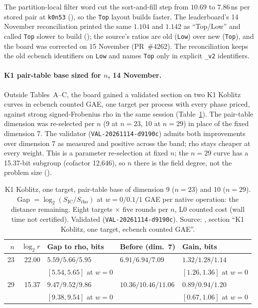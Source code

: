 The partition-local filter word cut the sort-and-fill step from $10.69$ to
$7.86$\,ns per stored pair at \texttt{k0n53}
(),
so the \texttt{Top} layout builds faster. The leaderboard's 14 November
reconciliation printed the same $1.104$ and $1.142$ as ``Top/Low'' and called
\texttt{Top} slower to build (); the source's
ratios are old (\texttt{Low}) over new (\texttt{Top}), and the board was
corrected on 15 November (PR~\#4262). The reconciliation
keeps the old ecbench identifiers on \texttt{Low} and names \texttt{Top}
only in explicit \texttt{\_v2} identifiers.

\paragraph{K1 pair-table base sized for $n$, 14 November.} Outside
Tables~A--C, the board gained a validated section on two K1 Koblitz curves
in ecbench counted GAE, one target per process with every phase priced,
against strong signed-Frobenius rho in the same session
(Table~\ref{tab:prog_koblitz-k1lgrow}). The pair-table dimension was
re-selected per $n$ (9 at $n=23$, 10 at $n=29$) in place of the fixed
dimension 7. The validator (\texttt{VAL-20261114-d9190c}) admits both
improvements over dimension 7 as measured and positive across the band;
rho stays cheaper at every weight. This is a parameter re-selection at fixed
$n$; the $n=29$ curve has a 15.37-bit subgroup (cofactor 12{,}646), so
$n$ there is the field degree, not the problem size
().

\begin{table}[t]
\centering\small
\begin{tabular}{@{}rrlll@{}}
\toprule
$n$ & $\log_2r$ & Gap to rho, bits & Before (dim.~7) & Gain, bits \\
\midrule
23 & 22.00 & $5.59/5.66/5.95$ & $6.91/6.94/7.09$ & $1.32/1.28/1.14$ \\
 & & $[5.54,5.65]$ at $w=0$ & & $[1.26,1.36]$ at $w=0$ \\
29 & 15.37 & $9.47/9.52/9.86$ & $10.36/10.46/11.06$ & $0.89/0.94/1.20$ \\
 & & $[9.38,9.54]$ at $w=0$ & & $[0.67,1.06]$ at $w=0$ \\
\bottomrule
\end{tabular}
\caption[]{K1 Koblitz, one target, pair-table base of dimension 9 ($n=23$)
and 10 ($n=29$). Gap $=\log_2(S_{\mathrm{IC}}/S_{\mathrm{rho}})$ at
$w=0/0.1/1$ GAE per native operation: the distance remaining. Eight
targets $\times$ five rounds per $n$, L0 counted cost (wall time not
certified). Validated (\texttt{VAL-20261114-d9190c}). Source:
, section ``K1 Koblitz, one target, ecbench
counted GAE''.}
\label{tab:prog_koblitz-k1lgrow}
\end{table}

